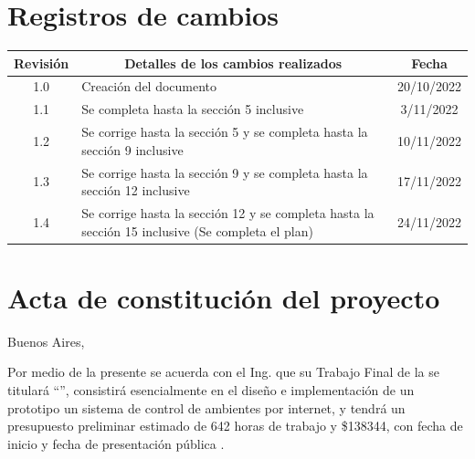 \documentclass[
11pt, %
]{charter}
\begin{document}
\maketitle
\thispagestyle{empty}
\pagebreak


\thispagestyle{empty}
{\setlength{\parskip}{0pt}
\tableofcontents{}
}
\pagebreak


\section*{Registros de cambios}
\label{sec:registro}


\begin{table}[ht]
\label{tab:registro}
\centering
\begin{tabularx}{\linewidth}{@{}|c|X|c|@{}}
\hline
\rowcolor[HTML]{C0C0C0} 
Revisión & \multicolumn{1}{c|}{\cellcolor[HTML]{C0C0C0}Detalles de los cambios realizados} & Fecha      \\ \hline

1.0		& Creación del documento												& 20/10/2022 \\ \hline
1.1		& Se completa hasta la sección 5 inclusive							& 3/11/2022 \\ \hline
1.2		& Se corrige hasta la sección 5 y se completa hasta la sección 9 inclusive							& 10/11/2022 \\ \hline
1.3		& Se corrige hasta la sección 9 y se completa hasta la sección 12 inclusive							& 17/11/2022 \\ \hline
1.4		& Se corrige hasta la sección 12 y se completa hasta la sección 15 inclusive (Se completa el plan)		& 24/11/2022 \\ \hline

\end{tabularx}
\end{table}

\pagebreak



\section*{Acta de constitución del proyecto}
\label{sec:acta}

\begin{flushright}
Buenos Aires, \fechaInicioName
\end{flushright}

\vspace{2cm}

Por medio de la presente se acuerda con el Ing. \authorname\hspace{1px} que su Trabajo Final de la \degreename\hspace{1px} se titulará ``\ttitle'', consistirá esencialmente en el diseño e implementación de un prototipo un sistema de control de ambientes por internet, y tendrá un presupuesto preliminar estimado de 642 horas de trabajo y \$138344, con fecha de inicio \fechaInicioName\hspace{1px} y fecha de presentación pública \fechaFinalName.
\end{document}
